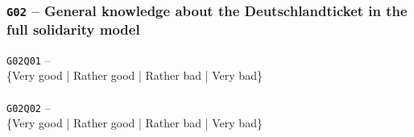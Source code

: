 \subsubsection{\texttt{G02} -- General knowledge about the Deutschlandticket in the full solidarity model}
\begin{displayquote}
    \texttt{G02Q01} -- \\
    \{Very good | Rather good | Rather bad | Very bad\}\\\\
    \texttt{G02Q02} -- \\
    \{Very good | Rather good | Rather bad | Very bad\}\\\\
\end{displayquote}

